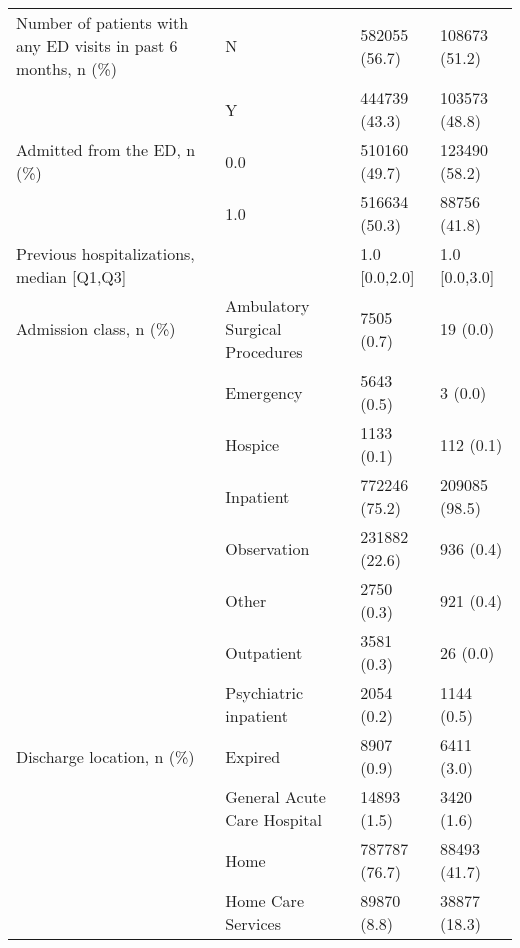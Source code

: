 \begin{tabular}{llll}
Number of patients with any ED visits in past 6 months, n (\%) & N &                         582055 (56.7) &     108673 (51.2) \\
                                       & Y &                         444739 (43.3) &     103573 (48.8) \\
Admitted from the ED, n (\%) & 0.0 &                         510160 (49.7) &     123490 (58.2) \\
                                       & 1.0 &                         516634 (50.3) &      88756 (41.8) \\
Previous hospitalizations, median [Q1,Q3] &   &                         1.0 [0.0,2.0] &     1.0 [0.0,3.0] \\
Admission class, n (\%) & Ambulatory Surgical Procedures &                            7505 (0.7) &          19 (0.0) \\
                                       & Emergency &                            5643 (0.5) &           3 (0.0) \\
                                       & Hospice &                            1133 (0.1) &         112 (0.1) \\
                                       & Inpatient &                         772246 (75.2) &     209085 (98.5) \\
                                       & Observation &                         231882 (22.6) &         936 (0.4) \\
                                       & Other &                            2750 (0.3) &         921 (0.4) \\
                                       & Outpatient &                            3581 (0.3) &          26 (0.0) \\
                                       & Psychiatric inpatient &                            2054 (0.2) &        1144 (0.5) \\
Discharge location, n (\%) & Expired &                            8907 (0.9) &        6411 (3.0) \\
                                       & General Acute Care Hospital &                           14893 (1.5) &        3420 (1.6) \\
                                       & Home &                         787787 (76.7) &      88493 (41.7) \\
                                       & Home Care Services &                           89870 (8.8) &      38877 (18.3) \\

\end{tabular}
